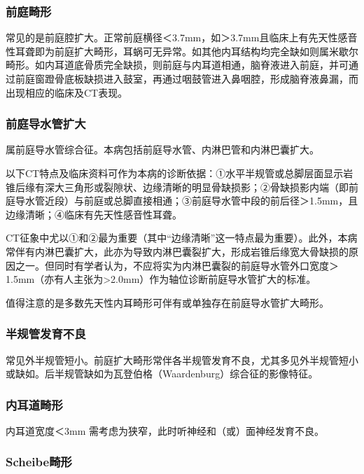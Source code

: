 \subsubsection{前庭畸形}

常见的是前庭腔扩大。正常前庭横径＜3.7mm，如＞3.7mm且临床上有先天性感音性耳聋即为前庭扩大畸形，耳蜗可无异常。如其他内耳结构均完全缺如则属米歇尔畸形。如内耳道底骨质完全缺损，则前庭与内耳道相通，脑脊液进入前庭，并可通过前庭窗蹬骨底板缺损进入鼓室，再通过咽鼓管进入鼻咽腔，形成脑脊液鼻漏，而出现相应的临床及CT表现。

\subsubsection{前庭导水管扩大}

属前庭导水管综合征。本病包括前庭导水管、内淋巴管和内淋巴囊扩大。

以下CT特点及临床资料可作为本病的诊断依据：①水平半规管或总脚层面显示岩锥后缘有深大三角形或裂隙状、边缘清晰的明显骨缺损影；②骨缺损影内端（即前庭导水管近段）与前庭或总脚直接相通；③前庭导水管中段的前后径＞1.5mm，且边缘清晰；④临床有先天性感音性耳聋。

CT征象中尤以①和②最为重要（其中“边缘清晰”这一特点最为重要）。此外，本病常伴有内淋巴囊扩大，此亦为导致内淋巴囊裂扩大，形成岩锥后缘宽大骨缺损的原因之一。但同时有学者认为，不应将实为内淋巴囊裂的前庭导水管外口宽度＞1.5mm（亦有人主张为\textgreater{}2.0mm）作为轴位诊断前庭导水管扩大的标准。

值得注意的是多数先天性内耳畸形可伴有或单独存在前庭导水管扩大畸形。

\subsubsection{半规管发育不良}

常见外半规管短小。前庭扩大畸形常伴各半规管发育不良，尤其多见外半规管短小或缺如。后半规管缺如为瓦登伯格（Waardenburg）综合征的影像特征。

\subsubsection{内耳道畸形}

内耳道宽度＜3mm 需考虑为狭窄，此时听神经和（或）面神经发育不良。

\subsubsection{Scheibe畸形}

